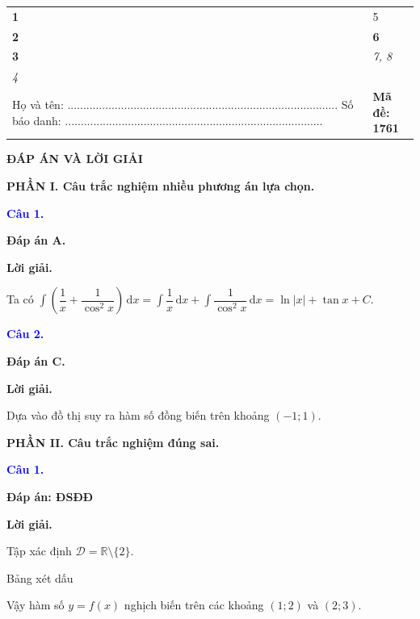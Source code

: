 \documentclass[12pt,a4paper]{article}
\begin{document}
\begin{center}
\begin{tabular}{p{}p{}}
\textbf{1} & 5 \tabularnewline
\textbf{2} & \textbf{6} \tabularnewline
\textbf{3} & \textit{7, 8} \tabularnewline
\textit{4} & \tabularnewline
Họ và tên: ...................................................................................... \newline Số báo danh: .................................................................................. & \textbf{Mã đề: 1761} \tabularnewline
\end{tabular}
\end{center}
\vspace{0.5cm}

\begin{center}
{\Large\textbf{ĐÁP ÁN VÀ LỜI GIẢI}}
\end{center}

\noindent\textbf{PHẦN I. Câu trắc nghiệm nhiều phương án lựa chọn.}

\medskip

\noindent\textcolor{blue}{\textbf{Câu 1.}}

\noindent \textbf{Đáp án A.}

\noindent\textbf{Lời giải.}

Ta có $\displaystyle\int \left(\dfrac{1}{x} + \dfrac{1}{\cos ^2 x}\right) \mathrm{\,d}x = \displaystyle\int \dfrac{1}{x} \mathrm{\,d}x + \displaystyle\int \dfrac{1}{\cos ^2 x} \mathrm{\,d}x = \ln |x| + \tan x + C$.

\medskip
\noindent\textcolor{blue}{\textbf{Câu 2.}}

\noindent \textbf{Đáp án C.}

\noindent\textbf{Lời giải.}

Dựa vào đồ thị suy ra hàm số đồng biến trên khoảng $(-1;1)$.

\medskip
\noindent\textbf{PHẦN II. Câu trắc nghiệm đúng sai.}

\medskip

\noindent\textcolor{blue}{\textbf{Câu 1.}}

\noindent \textbf{Đáp án: ĐSĐĐ}

\noindent\textbf{Lời giải.}

Tập xác định $\mathscr{D}=\mathbb{R} \setminus \{2\}$.

		Bảng xét dấu
		

		Vậy hàm số $y=f(x)$ nghịch biến trên các khoảng $(1;2)$ và $(2;3)$.
\end{document}
